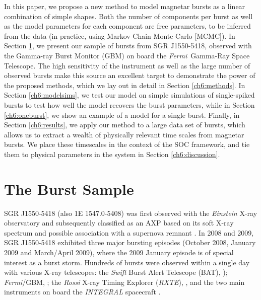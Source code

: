 \documentclass[12pt]{emulateapj}
\newcommand{\project}[1]{\textsl{#1}}
\newcommand{\fermi}{\project{Fermi}}
\newcommand{\rxte}{\project{RXTE}}
\begin{document}
In this paper, we propose a new method to model magnetar bursts as a linear combination of simple shapes. Both the number of components
per burst as well as the model parameters for each component are free parameters, to be inferred from the data (in practice, using
Markov Chain Monte Carlo [MCMC]). In Section \ref{ch6:data}, we present our sample of bursts from SGR J1550-5418, observed with the 
Gamma-ray Burst Monitor (GBM) on board the \fermi\ Gamma-Ray Space Telescope.
The high sensitivity of the instrument as well as 
the large number of observed bursts make this source an excellent target to demonstrate the power of the proposed methods, which we
lay out in detail in Section \ref{ch6:methods}.
In Section \ref{ch6:modelsims}, we test our model on simple simulations of single-spiked bursts to test how well the model recovers the burst parameters, while
in Section \ref{ch6:oneburst}, we show an example of a model for a single burst. Finally, in Section \ref{ch6:results}, we apply our method to a large data set of bursts, 
which allows us to extract a wealth of physically relevant time scales from magnetar bursts. 
We place these timescales in the context of the SOC framework, and tie them to physical parameters in the system in Section \ref{ch6:discussion}.


\section{The Burst Sample}
\label{ch6:data}

SGR J1550-5418 (also 1E 1547.0-5408) was first observed with the {\it Einstein} X-ray observatory \citep{lamb1981}
and subsequently classified as an AXP based on its soft X-ray spectrum and possible association with a supernova remnant \citep{gelfand2007}.
In 2008 and 2009, SGR J1550-5418 exhibited three major bursting episodes (October 2008, January 2009 and March/April 2009), where the 2009 January episode is of special interest as a
burst storm. Hundreds of bursts were observed within a single day with various X-ray telescopes: the \project{Swift} Burst Alert Telescope (BAT), \citep{israel2010, scholz2011}); \fermi/GBM, \citep{kaneko2010,vonkienlin2012,vanderhorst2012}; the \project{Rossi} X-ray Timing Explorer (\rxte), \citep{dib2012}, and the two main instruments on board the \project{INTEGRAL} spacecraft \citep{mereghetti2009, savchenko2010}.
 
\end{document}
